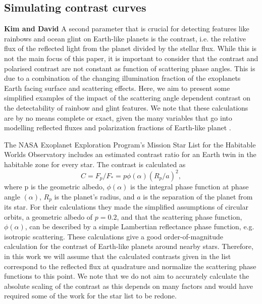 \documentclass[
    usenatbib,
]{mnras}
\begin{document}

\subsection{Simulating contrast curves}
\textbf{Kim and David}
%
A second parameter that is crucial for detecting features like rainbows and ocean glint on Earth-like planets is the contrast, i.e. the relative flux of the reflected light from the planet divided by the stellar flux. 
%
While this is not the main focus of this paper, it is important to consider that the contrast and polarised contrast are not constant as function of scattering phase angles.
%
This is due to a combination of the changing illumination fraction of the exoplanets Earth facing surface and scattering effects.
%
Here, we aim to present some simplified examples of the impact of the scattering angle dependent contrast on the detectability of rainbow and glint features. 
%
We note that these calculations are by no means complete or exact, given the many variables that go into modelling reflected fluxes and polarization fractions of Earth-like planet \citep{ treesstam2019,trees2022}.


The NASA Exoplanet Exploration Program’s Mission Star List for the Habitable Worlds Observatory includes an estimated contrast ratio for an Earth twin in the habitable zone for every star. 
%
The contrast is calculated as 
\begin{equation}
C = F_p/F_* = p \phi (\alpha) (R_p/a)^2,
\end{equation}
where p is the geometric albedo, $\phi (\alpha)$ is the integral phase function at phase angle $(\alpha)$, $R_p$ is the planet’s radius, and $a$ is the separation of the planet from its star. 
%
For their calculations they made the simplified assumptions of circular orbits, a geometric albedo of $p=0.2$, and that the scattering phase function, $\phi (\alpha)$, can be described by a simple Lambertian reflectance phase function, e.g. isotropic scattering.
%
These calculations give a good order-of-magnitude calculation for the contrast of Earth-like planets around nearby stars.
%
Therefore, in this work we will assume that the calculated contrasts given in the list correspond to the reflected flux at quadrature and normalize the scattering phase functions to this point.
%
We note that we do not aim to accurately calculate the absolute scaling of the contrast as this depends on many factors and would have required some of the work for the star list to be redone.
\end{document}

